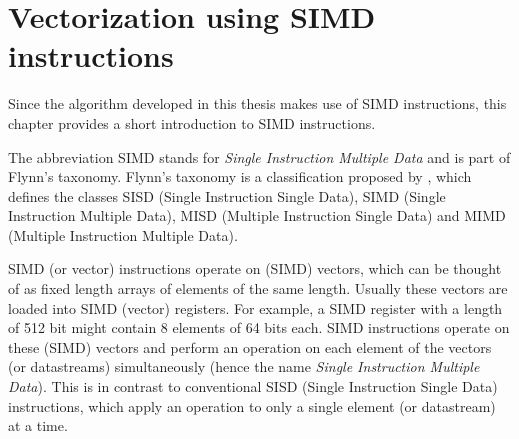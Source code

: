 \documentclass[12pt, a4paper, openright, twoside]{tiarbeit}
\begin{document}
\chapter{Vectorization using SIMD instructions}\label{chap:simd_instructions}

Since the algorithm developed in this thesis makes use of SIMD instructions,
this chapter provides a short introduction to SIMD instructions.

The abbreviation SIMD stands for \emph{Single Instruction Multiple Data} and is part
of Flynn's taxonomy. Flynn's taxonomy is a classification proposed by \citet{flynn},
which defines the classes SISD (Single Instruction Single Data),
SIMD (Single Instruction Multiple Data), MISD (Multiple Instruction Single Data)
and MIMD (Multiple Instruction Multiple Data).

SIMD (or vector) instructions operate on (SIMD) vectors, which can be thought of as fixed
length arrays of elements of the same length. Usually these vectors are
loaded into SIMD (vector) registers. For example, a SIMD register with a length
of 512 bit might contain 8 elements of 64 bits each.
SIMD instructions operate on these (SIMD) vectors and perform an operation on
each element of the vectors (or datastreams) simultaneously
(hence the name \emph{Single Instruction Multiple Data}).
This is in contrast to conventional
SISD (Single Instruction Single Data) instructions, which apply an operation
to only a single element (or datastream) at a time.
\end{document}
